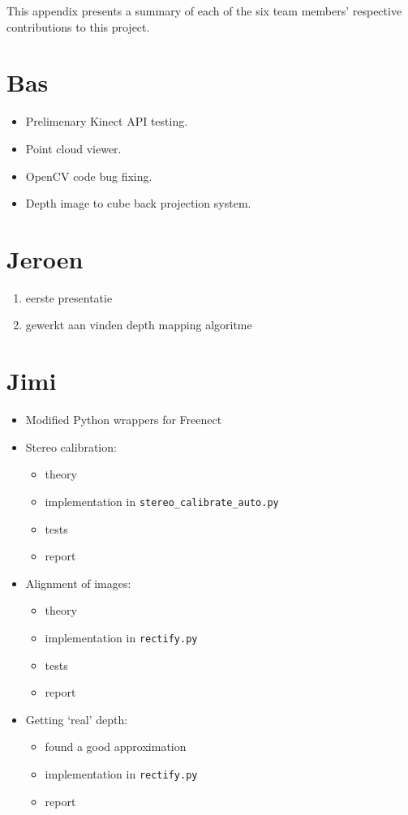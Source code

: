 This appendix presents a summary of each of the six team members' respective
contributions to this project.


\section*{Bas}
\begin{itemize}
    \item Prelimenary Kinect API testing.
    \item Point cloud viewer.
    \item OpenCV code bug fixing.
    \item Depth image to cube back projection system.
\end{itemize}

\section*{Jeroen}
\begin{enumerate}
\item eerste presentatie
\item gewerkt aan vinden depth mapping algoritme
\end{enumerate}

\section*{Jimi}
\begin{itemize}
\item Modified Python wrappers for Freenect
\item Stereo calibration:
    \begin{itemize}
        \item theory
        \item implementation in \verb|stereo_calibrate_auto.py|
        \item tests
        \item report
    \end{itemize}
\item Alignment of images:
    \begin{itemize}
        \item theory
        \item implementation in \verb|rectify.py|
        \item tests
        \item report
    \end{itemize}
\item Getting `real' depth:
    \begin{itemize}
        \item found a good approximation
        \item implementation in \verb|rectify.py|
        \item report
    \end{itemize}
\end{itemize}

